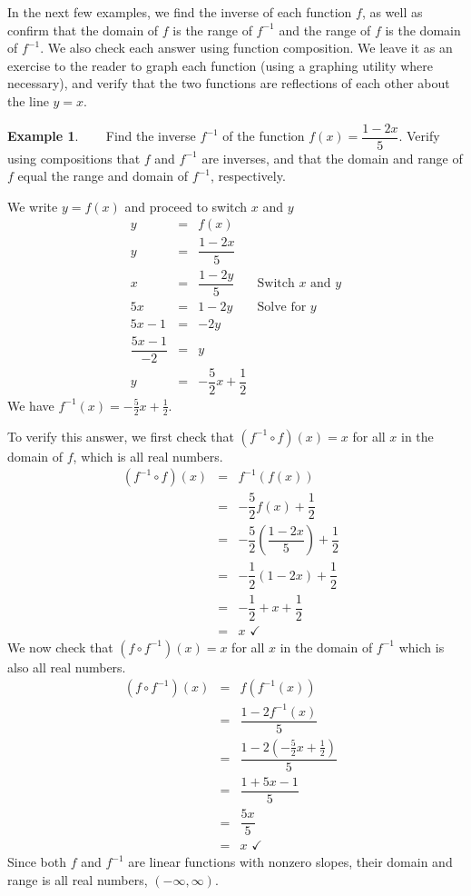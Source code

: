\documentclass[12pt]{book}
\theoremstyle{definition}
\newtheorem{example}{Example}
\begin{document}
In the next few examples, we find the inverse of each function $f$, as well as confirm that the domain of $f$ is the range of $f^{-1}$ and the range of $f$ is the domain of $f^{-1}$.  We also check each answer using function composition.  We leave it as an exercise to the reader to graph each function (using a graphing utility where necessary), and verify that the two functions are reflections of each other about the line $y=x$.
\begin{example}~~~  Find the inverse $f^{-1}$ of the function $f(x)=\dfrac{1-2x}{5}$.  Verify using compositions that $f$ and $f^{-1}$ are inverses, and that the domain and range of $f$ equal the range and domain of $f^{-1}$, respectively.\par
We write $y=f(x)$ and proceed to switch $x$ and $y$
\[ \begin{array}{rcll}
y & = & f(x) & \\ [3pt]
y & = &  \dfrac{1-2x}{5} & \\ [6pt]
x & = & \dfrac{1-2y}{5} & \mbox{Switch $x$ and $y$} \\ [6pt]
5x & = & 1 - 2y & \mbox{Solve for $y$} \\ [6pt]
5x-1 & = & -2y & \\ 
\dfrac{5x-1}{-2} & = & y & \\ 
y & = & -\dfrac{5}{2} x + \dfrac{1}{2} & 
\end{array} \]
We have $f^{-1}(x) = -\frac{5}{2} x + \frac{1}{2}$.\par
To verify this answer, we first check that $\left(f^{-1} \circ f \right)(x) = x $ for all $x$ in the domain of $f$, which is all real numbers.
\[ \begin{array}{rclr}
\left(f^{-1} \circ f \right)(x) & = & f^{-1}(f(x)) & \\ 
& = & -\dfrac{5}{2} f(x) + \dfrac{1}{2} & \\ [6pt]
& = & -\dfrac{5}{2} \left(\dfrac{1-2x}{5}\right) + \dfrac{1}{2} & \\ 
& = & -\dfrac{1}{2} (1-2x) + \dfrac{1}{2} & \\ [6pt]
& = & -\dfrac{1}{2} + x + \dfrac{1}{2} & \\ 
& = & x \, \, \checkmark 
\end{array}\]
We now check that $\left(f \circ f^{-1} \right)(x) = x $ for all $x$ in the domain of $f^{-1}$ which is also all real numbers.
\[ \begin{array}{rclr}
\left(f \circ f^{-1} \right)(x) & = & f(f^{-1}(x)) & \\ [3pt]
& = &\dfrac{1-2f^{-1}(x)}{5} & \\ [6pt]
& = &\dfrac{1-2\left(  -\frac{5}{2} x + \frac{1}{2} \right)}{5} & \\ [6pt]
& = & \dfrac{1+5x-1}{5} & \\ 
& = &\dfrac{5x}{5}  & \\
& = & x \, \, \checkmark
\end{array}\]
Since both $f$ and $f^{-1}$ are linear functions with nonzero slopes, their domain and range is all real numbers, $(-\infty,\infty)$.
\end{example}
\end{document}
